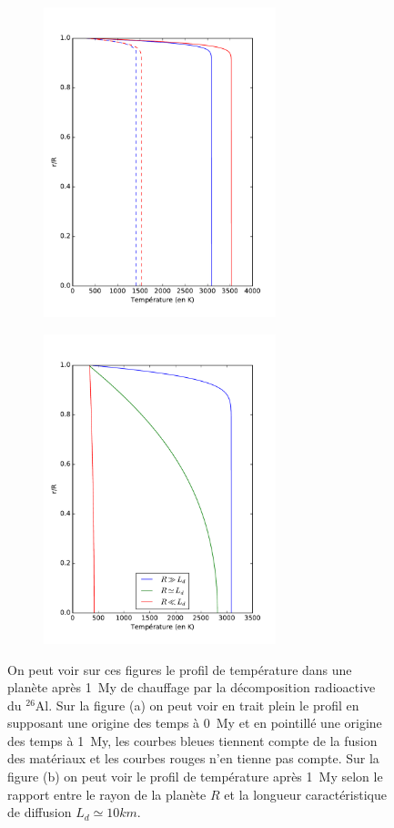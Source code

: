 \documentclass[10pt,a4paper]{article}
\numberwithin{equation}{section}
\begin{document}
\begin{figure}
\centering
\begin{subfigure}{.5\textwidth}
  \centering
  
  \includegraphics[height=9cm]{./figures/graph_sim1_fig1.pdf}
  \caption{}
  \label{fig:sub1}
\end{subfigure}%
\begin{subfigure}{.5\textwidth}
  \centering
  \includegraphics[height=9cm]{./figures/graph_sim1_fig2.pdf}
  \caption{}
  \label{fig:sub2}
\end{subfigure}
\caption{On peut voir sur ces figures le profil de température dans une planète après \SI{1}{My} de chauffage par la décomposition radioactive du $^{26}$Al. Sur la figure (a) on peut voir en trait plein le profil en supposant une origine des temps à \SI{0}{My} et en pointillé une origine des temps à \SI{1}{My}, les courbes bleues tiennent compte de la fusion des matériaux et les courbes rouges n'en tienne pas compte. Sur la figure (b) on peut voir le profil de température après \SI{1}{My} selon le rapport entre le rayon de la planète $R$ et la longueur caractéristique de diffusion $L_d \simeq 10 km $. }
\label{fig:test}
\end{figure}
\end{document}
